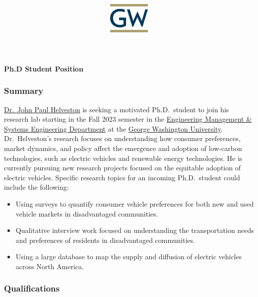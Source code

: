 \documentclass[
  12pt,
  letterpaper,
  DIV=11,
  numbers=noendperiod]{scrartcl}
\title{\includegraphics[width=0.15\textwidth, right]{logo.png}}
\author{}
\date{}
\providecommand{\tightlist}{%
  \setlength{\itemsep}{0pt}\setlength{\parskip}{0pt}}\usepackage{longtable,booktabs,array}
\begin{document}
\maketitle
\ifdefined\Shaded\renewenvironment{Shaded}{\begin{tcolorbox}[borderline west={3pt}{0pt}{shadecolor}, interior hidden, breakable, frame hidden, boxrule=0pt, enhanced, sharp corners]}{\end{tcolorbox}}\fi

\vspace{-120pt}

\begin{center}
\Large{\textbf{Ph.D Student Position}}
\end{center}

\hypertarget{summary}{%
\subsubsection{Summary}\label{summary}}

\href{https://jhelvy.com/}{Dr.~John Paul Helveston} is seeking a
motivated Ph.D.~student to join his research lab starting in the Fall
2023 semester in the \href{https://www.emse.seas.gwu.edu/}{Engineering
Management \& Systems Engineering Department} at the
\href{https://www.gwu.edu/}{George Washington University}.
Dr.~Helveston's research focuses on understanding how consumer
preferences, market dynamics, and policy affect the emergence and
adoption of low-carbon technologies, such as electric vehicles and
renewable energy technologies. He is currently pursuing new research
projects focused on the equitable adoption of electric vehicles.
Specific research topics for an incoming Ph.D.~student could include the
following:

\begin{itemize}
\tightlist
\item
  Using surveys to quantify consumer vehicle preferences for both new
  and used vehicle markets in disadvantaged communities.
\item
  Qualitative interview work focused on understanding the transportation
  needs and preferences of residents in disadvantaged communities.
\item
  Using a large database to map the supply and diffusion of electric
  vehicles across North America.
\end{itemize}

\hypertarget{qualifications}{%
\subsubsection{Qualifications}\label{qualifications}}
\end{document}
